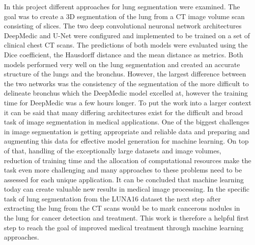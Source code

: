 
In this project different approaches for lung segmentation were examined. The goal was to create a 3D segmentation of the lung from a CT image volume scan consisting of slices. The two deep convolutional neuronal network architectures DeepMedic and U-Net were configured and implemented to be trained on a set of clinical chest CT scans. The predictions of both models were evaluated using the Dice coefficient, the Hausdorff distance and the mean distance as metrics. Both models performed very well on the lung segmentation and created an accurate structure of the lungs and the bronchus. However, the largest difference between the two networks was the consistency of the segmentation of the more difficult to delineate bronchus which the DeepMedic model excelled at, however the training time for DeepMedic was a few hours longer.\newline
To put the work into a larger context it can be said that many differing architectures exist for the difficult and broad task of image segmentation in medical applications. One of the biggest challenges in image segmentation is getting appropriate and reliable data and preparing and augmenting this data for effective model generation for machine learning. On top of that, handling of the exceptionally large datasets and image volumes, reduction of training time and the allocation of computational resources make the task even more challenging and many approaches to these problems need to be assessed for each unique application.\newline
It can be concluded that machine learning today can create valuable new results in medical image processing. In the specific task of lung segmentation from the LUNA16 dataset the next step after extracting the lung from the CT scans would be to mark cancerous nodules in the lung for cancer detection and treatment. This work is therefore a helpful first step to reach the goal of improved medical treatment through machine learning approaches.